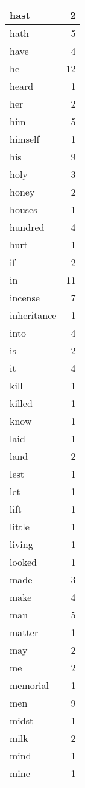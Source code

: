 \begin{center}
\begin{longtable}{l|r}
hast & 2 \\ \hline
hath & 5 \\ \hline
have & 4 \\ \hline
he & 12 \\ \hline
heard & 1 \\ \hline
her & 2 \\ \hline
him & 5 \\ \hline
himself & 1 \\ \hline
his & 9 \\ \hline
holy & 3 \\ \hline
honey & 2 \\ \hline
houses & 1 \\ \hline
hundred & 4 \\ \hline
hurt & 1 \\ \hline
if & 2 \\ \hline
in & 11 \\ \hline
incense & 7 \\ \hline
inheritance & 1 \\ \hline
into & 4 \\ \hline
is & 2 \\ \hline
it & 4 \\ \hline
kill & 1 \\ \hline
killed & 1 \\ \hline
know & 1 \\ \hline
laid & 1 \\ \hline
land & 2 \\ \hline
lest & 1 \\ \hline
let & 1 \\ \hline
lift & 1 \\ \hline
little & 1 \\ \hline
living & 1 \\ \hline
looked & 1 \\ \hline
made & 3 \\ \hline
make & 4 \\ \hline
man & 5 \\ \hline
matter & 1 \\ \hline
may & 2 \\ \hline
me & 2 \\ \hline
memorial & 1 \\ \hline
men & 9 \\ \hline
midst & 1 \\ \hline
milk & 2 \\ \hline
mind & 1 \\ \hline
mine & 1 \\ \hline

\end{longtable}
\end{center}
